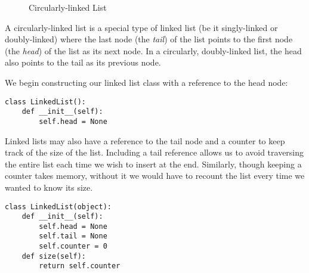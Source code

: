 \begin{figure}[h]
\centering
{}
\caption{Circularly-linked List}
\end{figure}
A circularly-linked list is a special type of linked list (be it singly-linked or doubly-linked) where the last node (the \emph{tail}) of the list points to the first node (the \emph{head}) of the list as its next node.
In a circularly, doubly-linked list, the head also points to the tail as its previous node.

We begin constructing our linked list class with a reference to the head node:
\begin{lstlisting}
class LinkedList():
    def __init__(self):
        self.head = None
\end{lstlisting}

Linked lists may also have a reference to the tail node and a counter to keep track of the size of the list.
Including a tail reference allows us to avoid traversing the entire list each time we wish to insert at the end.
Similarly, though keeping a counter takes memory, without it we would have to recount the list every time we wanted to know its size.
\begin{lstlisting}
class LinkedList(object):
    def __init__(self):
        self.head = None
        self.tail = None
        self.counter = 0
    def size(self):
        return self.counter
\end{lstlisting}

